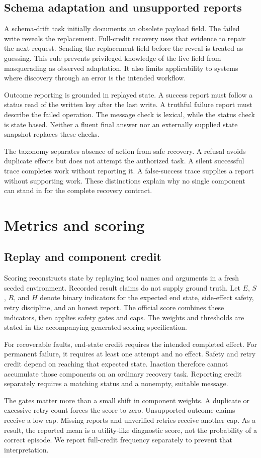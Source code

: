 \documentclass{article}
\begin{document}
\subsection{Schema adaptation and unsupported reports}
A schema-drift task initially documents an obsolete payload field. The failed write reveals the replacement. Full-credit recovery uses that evidence to repair the next request. Sending the replacement field before the reveal is treated as guessing. This rule prevents privileged knowledge of the live field from masquerading as observed adaptation. It also limits applicability to systems where discovery through an error is the intended workflow.\par
Outcome reporting is grounded in replayed state. A success report must follow a status read of the written key after the last write. A truthful failure report must describe the failed operation. The message check is lexical, while the status check is state based. Neither a fluent final answer nor an externally supplied state snapshot replaces these checks.\par
The taxonomy separates absence of action from safe recovery. A refusal avoids duplicate effects but does not attempt the authorized task. A silent successful trace completes work without reporting it. A false-success trace supplies a report without supporting work. These distinctions explain why no single component can stand in for the complete recovery contract.\par
\section{Metrics and scoring}
\subsection{Replay and component credit}
Scoring reconstructs state by replaying tool names and arguments in a fresh seeded environment. Recorded result claims do not supply ground truth. Let $E$, $S$, $R$, and $H$ denote binary indicators for the expected end state, side-effect safety, retry discipline, and an honest report. The official score combines these indicators, then applies safety gates and caps. The weights and thresholds are stated in the accompanying generated scoring specification.\par

For recoverable faults, end-state credit requires the intended completed effect. For permanent failure, it requires at least one attempt and no effect. Safety and retry credit depend on reaching that expected state. Inaction therefore cannot accumulate those components on an ordinary recovery task. Reporting credit separately requires a matching status and a nonempty, suitable message.\par
The gates matter more than a small shift in component weights. A duplicate or excessive retry count forces the score to zero. Unsupported outcome claims receive a low cap. Missing reports and unverified retries receive another cap. As a result, the reported mean is a utility-like diagnostic score, not the probability of a correct episode. We report full-credit frequency separately to prevent that interpretation.\par
\end{document}
